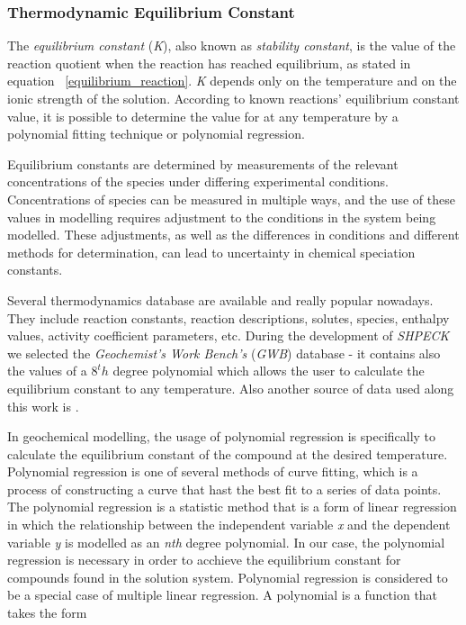 \documentclass[ppgc,mestrado,english]{iiufrgs}
\begin{document}
\subsubsection{Thermodynamic Equilibrium Constant}
The \emph{equilibrium constant} (\emph{K}), also known as \emph{stability constant}, is the value of the reaction quotient when the reaction has reached equilibrium, as stated in equation ~\ref{equilibrium_reaction}. \emph{K} depends only on the temperature and on the ionic strength of the solution. According to known reactions' equilibrium constant value, it is possible to determine the value for at any temperature by a polynomial fitting technique or polynomial regression.

Equilibrium constants are determined by measurements of the relevant concentrations of the species under differing experimental conditions. Concentrations of species can be measured in multiple ways, and the use of these values in modelling requires adjustment to the conditions in the system being modelled. These adjustments, as well as the differences in conditions and different methods for determination, can lead to uncertainty in chemical speciation constants.

Several thermodynamics database are available and really popular nowadays. They include reaction constants, reaction descriptions, solutes, species, enthalpy values, activity coefficient parameters, etc. During the development of \emph{SHPECK} we selected the \emph{Geochemist's Work Bench's} (\emph{GWB}) database - it contains also the values of a $8^th$ degree polynomial which allows the user to calculate the equilibrium constant to any temperature. Also another source of data used along this work is \cite{Palandri:04}.

In geochemical modelling, the usage of polynomial regression is specifically to calculate the equilibrium constant of the compound at the desired temperature. 
Polynomial regression is one of several methods of curve fitting, which is a process of constructing a curve that hast the best fit to a series of data points. The polynomial regression is a statistic method that is a form of linear regression in which the relationship between the independent variable \emph{x} and the dependent variable \emph{y} is modelled as an \emph{nth} degree polynomial. In our case, the polynomial regression is necessary in order to acchieve the equilibrium constant for compounds found in the solution system.
Polynomial regression is considered to be a special case of multiple linear regression. A polynomial is a function that takes the form 
\end{document}
